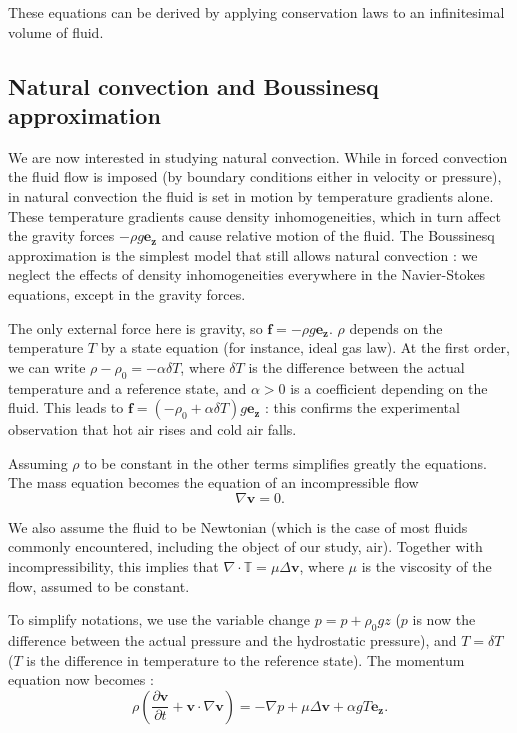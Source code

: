 \documentclass[12pt]{article}
\newcommand{\vb}[1]{\ensuremath{\mathbf{#1}}}
\begin{document}
These equations can be derived by applying conservation laws to an
infinitesimal volume of fluid.
\subsection{Natural convection and Boussinesq approximation}
We are now interested in studying natural convection. While in forced
convection the fluid flow is imposed (by boundary conditions either in
velocity or pressure), in natural convection the fluid is set in
motion by temperature gradients alone.  These temperature gradients
cause density inhomogeneities, which in turn affect the gravity forces
$- \rho g \vb{e_z}$ and cause relative motion of the fluid. The
Boussinesq approximation is the simplest model that still allows
natural convection : we neglect the effects of density inhomogeneities
everywhere in the Navier-Stokes equations, except in the gravity
forces.

The only external force here is gravity, so $\vb{f} = -\rho g
\vb{e_z}$. $\rho$ depends on the temperature $T$ by a state equation
(for instance, ideal gas law). At the first order, we can write $\rho
- \rho_0 = - \alpha \delta T$, where $\delta T$ is the difference
between the actual temperature and a reference state, and $\alpha > 0$
is a coefficient depending on the fluid. This leads to $\vb{f} =
(-\rho_0 + \alpha \delta T) g \vb{e_z}$ : this confirms the
experimental observation that hot air rises and cold air falls.

Assuming $\rho$ to be constant in the other terms simplifies greatly
the equations. The mass equation becomes the equation of an
incompressible flow
\begin{equation}
  \label{ns-b-mass}
  \nabla \vb{v} = 0.
\end{equation}

We also assume the fluid to be Newtonian (which is the case of most
fluids commonly encountered, including the object of our study,
air). Together with incompressibility, this implies that $\nabla \cdot
\mathbb T = \mu \Delta \vb{v}$, where $\mu$ is the viscosity of the
flow, assumed to be constant.

To simplify notations, we use the variable change $p = p + \rho_0 g z$
($p$ is now the difference between the actual pressure and the
hydrostatic pressure), and $T = \delta T$ ($T$ is the difference in
temperature to the reference state). The momentum equation now
becomes :
\begin{equation}
  \label{ns-mom}
  \rho \left(\frac{\partial \mathbf{v}}{\partial t} + \mathbf{v} \cdot
    \nabla \mathbf{v}\right) = -\nabla p + \mu \Delta \vb{v} + \alpha g
  T \vb{e_z}.
\end{equation}
\end{document}
